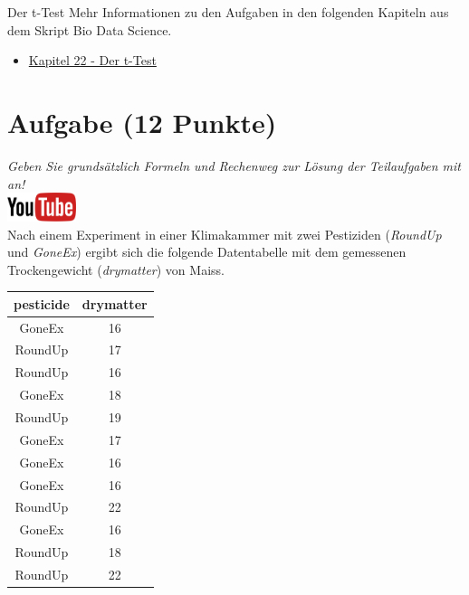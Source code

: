 \documentclass[a4paper, 9pt]{scrartcl}\usepackage[]{graphicx}\usepackage[]{xcolor}
\begin{document}
\clearpage
\begin{graybox}{Der t-Test}
Mehr Informationen zu den Aufgaben in den folgenden Kapiteln aus dem Skript Bio Data Science.
  \begin{itemize}
  \item \href{https://jkruppa.github.io/stat-tests-ttest.html}{Kapitel 22 - Der t-Test}
  \end{itemize}
\end{graybox}
\clearpage

\section{Aufgabe \hfill (12 Punkte)}

\textit{Geben Sie grunds{\"a}tzlich Formeln und Rechenweg zur L{\"o}sung der
  Teilaufgaben mit an!} \\[1Ex]

\hfill\href{https://youtu.be/Cq_rF_z4xOk}{\includegraphics[width =
  2cm]{img/youtube}}\\[1Ex]



Nach einem Experiment in einer Klimakammer mit zwei Pestiziden (\textit{RoundUp} und
\textit{GoneEx}) ergibt sich die folgende Datentabelle mit dem gemessenen
Trockengewicht (\textit{drymatter}) von Maiss.

\begin{table}[!h]
\centering
\begin{tabular}{cc}
\toprule
pesticide & drymatter\\
\midrule
GoneEx & 16\\
RoundUp & 17\\
RoundUp & 16\\
GoneEx & 18\\
RoundUp & 19\\
\addlinespace
GoneEx & 17\\
GoneEx & 16\\
GoneEx & 16\\
RoundUp & 22\\
GoneEx & 16\\
\addlinespace
RoundUp & 18\\
RoundUp & 22\\
\bottomrule
\end{tabular}
\end{table}
\end{document}
